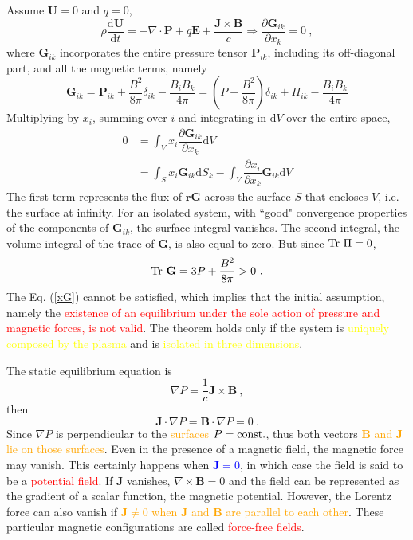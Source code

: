 \documentclass[12pt,a4paper]{article}
\renewcommand{\vec}[1]{\boldsymbol{#1}}
\newcommand{\dif}{\mathrm{d}}
\newcounter{theo}[section]\setcounter{theo}{0}
\begin{document}
Assume $\vec{U} = 0$ and $q = 0$, 
\begin{equation*}
\boxed{\rho\frac{\dif \vec{U}}{\dif t} = -\nabla \cdot  \mathbf P +q \vec{E} +\frac{\vec{J}\times \vec{B}}{c}} \Longrightarrow\dfrac{\partial \mathbf G_{ik} }{\partial x_k} = 0 ~,
\end{equation*}
where $\mathbf G_{ik}$ incorporates the entire pressure tensor $ \mathbf P_{ik}$, including its off-diagonal part, and all the magnetic terms, namely
\begin{equation*}
\mathbf G_{ik} = \mathbf P_{ik} +\frac{B^2}{8\pi} \delta_{ik} -\frac{B_iB_k}{4\pi} = \left(P + \frac{B^2}{8\pi} \right)\delta_{ik} +\Pi_{ik} -\frac{B_iB_k}{4\pi}
\end{equation*}
Multiplying by $x_i$, summing over $i$ and integrating in $\dif V$ over the entire space,
\begin{align}
\nonumber 0 &= \int_V x_i \dfrac{\partial \mathbf G_{ik} }{\partial x_k}  \dif V \\
&= \int_S x_i \mathbf G_{ik} \dif S_k -\int_V \dfrac{\partial x_i }{\partial x_k} \mathbf G_{ik} \dif V
\label{xG}
\end{align}
The first term represents the flux of $\vec{r} \mathbf G$ across the surface $S$ that encloses $V$, i.e. the surface at infinity. For an isolated system, with ``good" convergence properties of the components of $\mathbf G_{ik}$, the surface integral vanishes. The second integral, the volume integral of the trace of $\mathbf G$, is also equal to zero. But since ${\rm Tr}~ \Pi = 0$,
\begin{equation}
{\rm Tr}~ \mathbf G = 3P +\frac{B^2}{8\pi} > 0 ~.
\end{equation}
The Eq. (\ref{xG}) cannot be satisfied, which implies that the initial assumption, namely the \textcolor{red}{existence of an equilibrium under the sole action of pressure and magnetic forces, is not valid}. The theorem holds only if the system is \textcolor{yellow}{uniquely composed by the plasma} and is \textcolor{yellow}{isolated in three dimensions}.

The static equilibrium equation is
\begin{equation}
\nabla P = \frac{1}{c} \vec{J} \times \vec{B} ~,
\end{equation}
then
\begin{equation*}
\vec{J}  \cdot \nabla P =  \vec{B}\cdot \nabla P = 0~.
\end{equation*}
Since $\nabla P$ is perpendicular to the \textcolor{orange}{surfaces $P = {\rm const.}$}, thus both vectors \textcolor{orange}{$\vec{B}$ and $\vec{J}$ lie on those surfaces}. Even in the presence of a magnetic field, the magnetic force may vanish. This certainly happens when \textcolor{blue}{$\vec{J} = 0$}, in which case the field is said to be a \textcolor{red}{potential field}. If $\vec{J}$ vanishes, $\nabla \times \vec{B} = 0$ and the field can be represented as the gradient of a scalar function, the magnetic potential. However, the Lorentz force can also vanish if \textcolor{orange}{$\vec{J} \neq 0$ when $\vec{J}$ and $\vec{B}$ are parallel to each other}. These particular magnetic configurations are called \textcolor{red}{force-free fields}. 
\end{document}

